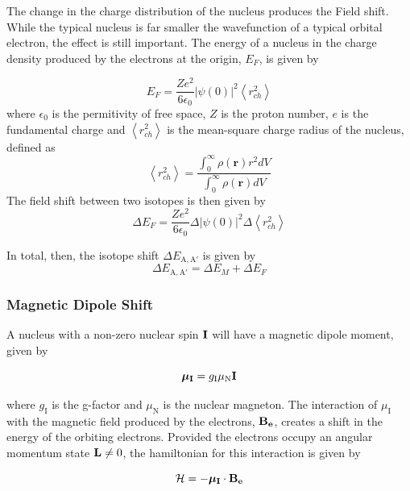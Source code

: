 The change in the charge distribution of the nucleus produces the Field shift. While the typical nucleus is far smaller the wavefunction of a typical orbital electron, the effect is still important. The energy of a nucleus in the charge density produced by the electrons at the origin, $E_F$, is given by

\begin{equation}
E_F = \frac{Ze^2}{6 \epsilon_0}|\psi(0)|^2 \left\langle r_{ch}^2\right\rangle
\end{equation}
where $\epsilon_0$ is the permitivity of free space, $Z$ is the proton number, $e$ is the fundamental charge and $ \left\langle r_{ch}^2\right\rangle$ is the mean-square charge radius of the nucleus, defined as
\begin{equation}
 \left\langle r_{ch}^2\right\rangle = \frac{\int_0^{\infty}\rho(\mathbf{r})r^2dV}{\int_0^{\infty}\rho(\mathbf{r})dV}
\end{equation}
The field shift between two isotopes is then given by
\begin{equation}
\Delta E_F =  \frac{Ze^2}{6 \epsilon_0}\Delta|\psi(0)|^2 \Delta\left\langle r_{ch}^2\right\rangle
\end{equation}

In total, then, the isotope shift $\Delta E_{\mathrm{A,A}'}$ is given by
\begin{equation}
 \Delta E_{\mathrm{A,A'}} = \Delta E_M + \Delta E_F
\end{equation}
\subsubsection{Magnetic Dipole Shift}
A nucleus with a non-zero nuclear spin $\bf{I}$  will have a magnetic dipole moment, given by

\begin{equation}
\boldsymbol{\mu}_{\mathrm{\bf{I}}} = g_{\mathrm{I}}\mu_{\mathrm{N}}\mathrm{\bf{I}}
\end{equation}

where $g_{\mathrm{I}}$ is the g-factor and $\mu_{\mathrm{N}}$ is the nuclear magneton.\cite{Nut} The interaction of $\mu_{\mathrm{I}}$ with the magnetic field produced by the electrons, $\mathrm{\bf{B_e}}$, creates a shift in the energy of the orbiting electrons. Provided the electrons occupy an angular momentum state $\mathrm{\bf{L}} \neq 0$, the hamiltonian for this interaction is given by

\begin{equation}
\mathcal{H} = -\boldsymbol{\mu}_{\mathrm{\bf{I}}} \cdot \mathrm{\bf{B_e}}
\end{equation}

